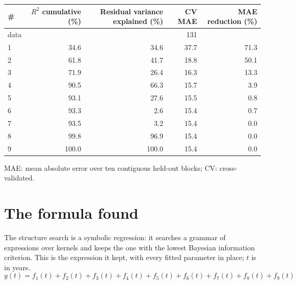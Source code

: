 \documentclass[11pt,a4paper]{article}
\begin{document}
\begin{center}
\begin{tabular}{lrrrr}
\toprule
\# & $R^2$ cumulative (\%) & Residual variance explained (\%) & CV MAE & MAE reduction (\%) \\
\midrule
data & & & 131 & \\
1 & 34.6 & 34.6 & 37.7 & 71.3 \\
2 & 61.8 & 41.7 & 18.8 & 50.1 \\
3 & 71.9 & 26.4 & 16.3 & 13.3 \\
4 & 90.5 & 66.3 & 15.7 & 3.9 \\
5 & 93.1 & 27.6 & 15.5 & 0.8 \\
6 & 93.3 & 2.6 & 15.4 & 0.7 \\
7 & 93.5 & 3.2 & 15.4 & 0.0 \\
8 & 99.8 & 96.9 & 15.4 & 0.0 \\
9 & 100.0 & 100.0 & 15.4 & 0.0 \\
\bottomrule
\end{tabular}
\end{center}

MAE: mean absolute error over ten contiguous held-out blocks; CV: cross-validated.

\section*{The formula found}

The structure search is a symbolic regression: it searches a grammar of expressions over kernels and keeps the one with the lowest Bayesian information criterion. This is the expression it kept, with every fitted parameter in place; $t$ is in years.
\begin{dmath*}
y(t) = f_{1}(t) + f_{2}(t) + f_{3}(t) + f_{4}(t) + f_{5}(t) + f_{6}(t) + f_{7}(t) + f_{8}(t) + f_{9}(t)
\end{dmath*}
\end{document}

